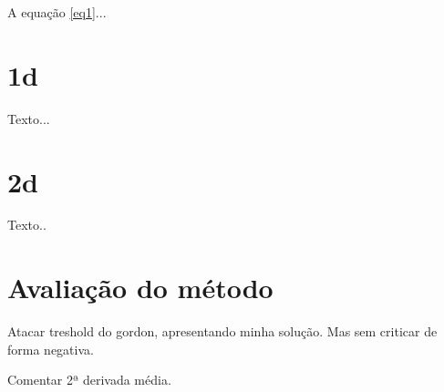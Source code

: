 	A equação \eqref{eq1}...
    
\section{1d}
\label{gordon.1d}
	Texto...
    
\section{2d}
\label{gordon.2d}    
    Texto..
    
\section{Avaliação do método}
\label{gordon.aval}    
    Atacar treshold do gordon, apresentando minha solução. Mas sem criticar de forma negativa.
    
    Comentar 2ª derivada média.